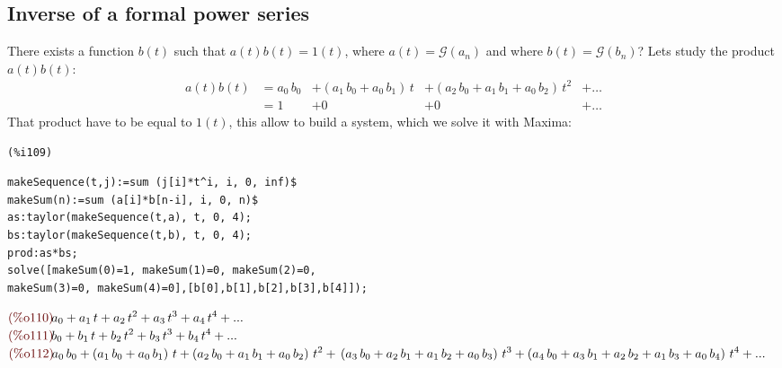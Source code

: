 \subsection{Inverse of a formal power series}


There exists a function $b(t)$ such that $a(t)b(t)=1(t)$, where $a(t)
= \mathcal{G} (a_n)$ and where $b(t) = \mathcal{G} (b_n)$? Lets study
the product $a(t)b(t)$:
\begin{displaymath}
  \begin{split}
    a(t)b(t) &= {a}_{0}\,{b}_{0}&+\left(
      {a}_{1}\,{b}_{0}+{a}_{0}\,{b}_{1}\right) \,t&+\left(
      {a}_{2}\,{b}_{0}+{a}_{1}\,{b}_{1}+{a}_{0}\,{b}_{2}\right)
    \,{t}^{2}&+ \ldots\\
    &= 1 &+ 0 &+ 0 &+ \ldots
  \end{split}
\end{displaymath}
That product have to be equal to $1(t)$, this allow to build a system,
which we solve it with Maxima:\\
\noindent
\begin{minipage}[t]{8ex}{\color{red}\bf
\begin{verbatim}
(%i109) 
\end{verbatim}}
\end{minipage}
\begin{minipage}[t]{\textwidth}{\color{blue}
\begin{verbatim}
makeSequence(t,j):=sum (j[i]*t^i, i, 0, inf)$
makeSum(n):=sum (a[i]*b[n-i], i, 0, n)$
as:taylor(makeSequence(t,a), t, 0, 4);
bs:taylor(makeSequence(t,b), t, 0, 4);
prod:as*bs;
solve([makeSum(0)=1, makeSum(1)=0, makeSum(2)=0,
makeSum(3)=0, makeSum(4)=0],[b[0],b[1],b[2],b[3],b[4]]);
\end{verbatim}}
\end{minipage}
\begin{math}\displaystyle
\parbox{8ex}{\color{labelcolor}(\%o110) }
{a}_{0}+{a}_{1}\,t+{a}_{2}\,{t}^{2}+{a}_{3}\,{t}^{3}+{a}_{4}\,{t}^{4}+...
\end{math}\\
\begin{math}\displaystyle
\parbox{8ex}{\color{labelcolor}(\%o111) }
{b}_{0}+{b}_{1}\,t+{b}_{2}\,{t}^{2}+{b}_{3}\,{t}^{3}+{b}_{4}\,{t}^{4}+...
\end{math}\\
\begin{math}\displaystyle
\parbox{8ex}{\color{labelcolor}(\%o112) }
{a}_{0}\,{b}_{0}+\left( {a}_{1}\,{b}_{0}+{a}_{0}\,{b}_{1}\right)
\,t+\left( {a}_{2}\,{b}_{0}+{a}_{1}\,{b}_{1}+{a}_{0}\,{b}_{2}\right)
\,{t}^{2}+\\
\left( {a}_{3}\,{b}_{0}+{a}_{2}\,{b}_{1}+{a}_{1}\,{b}_{2}+{a}_{0}\,{b}_{3}\right) \,{t}^{3}+\left( {a}_{4}\,{b}_{0}+{a}_{3}\,{b}_{1}+{a}_{2}\,{b}_{2}+{a}_{1}\,{b}_{3}+{a}_{0}\,{b}_{4}\right) \,{t}^{4}+...
\end{math}\\
